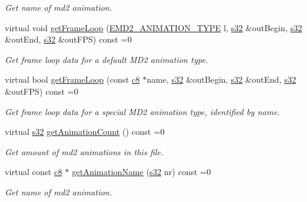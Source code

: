 \begin{DoxyCompactItemize}
\begin{DoxyCompactList}\small\item\em Get name of md2 animation. \end{DoxyCompactList}\item 
virtual void \hyperlink{classirr_1_1scene_1_1IAnimatedMeshMD2_a0bab7f9b11fd11f1fa8f2cd6e085b596}{get\+Frame\+Loop} (\hyperlink{namespaceirr_1_1scene_a08d4a84966e1d2886d0d57e4acbb4f19}{E\+M\+D2\+\_\+\+A\+N\+I\+M\+A\+T\+I\+O\+N\+\_\+\+T\+Y\+PE} l, \hyperlink{namespaceirr_ac66849b7a6ed16e30ebede579f9b47c6}{s32} \&out\+Begin, \hyperlink{namespaceirr_ac66849b7a6ed16e30ebede579f9b47c6}{s32} \&out\+End, \hyperlink{namespaceirr_ac66849b7a6ed16e30ebede579f9b47c6}{s32} \&out\+F\+PS) const =0
\begin{DoxyCompactList}\small\item\em Get frame loop data for a default M\+D2 animation type. \end{DoxyCompactList}\item 
virtual bool \hyperlink{classirr_1_1scene_1_1IAnimatedMeshMD2_a4d52cae663c479d88296561ec961410a}{get\+Frame\+Loop} (const \hyperlink{namespaceirr_a9395eaea339bcb546b319e9c96bf7410}{c8} $\ast$name, \hyperlink{namespaceirr_ac66849b7a6ed16e30ebede579f9b47c6}{s32} \&out\+Begin, \hyperlink{namespaceirr_ac66849b7a6ed16e30ebede579f9b47c6}{s32} \&out\+End, \hyperlink{namespaceirr_ac66849b7a6ed16e30ebede579f9b47c6}{s32} \&out\+F\+PS) const =0
\begin{DoxyCompactList}\small\item\em Get frame loop data for a special M\+D2 animation type, identified by name. \end{DoxyCompactList}\item 
\mbox{\label{classirr_1_1scene_1_1IAnimatedMeshMD2_abb4479ea266ea54230bf21c36319b323}} 
virtual \hyperlink{namespaceirr_ac66849b7a6ed16e30ebede579f9b47c6}{s32} \hyperlink{classirr_1_1scene_1_1IAnimatedMeshMD2_abb4479ea266ea54230bf21c36319b323}{get\+Animation\+Count} () const =0
\begin{DoxyCompactList}\small\item\em Get amount of md2 animations in this file. \end{DoxyCompactList}\item 
virtual const \hyperlink{namespaceirr_a9395eaea339bcb546b319e9c96bf7410}{c8} $\ast$ \hyperlink{classirr_1_1scene_1_1IAnimatedMeshMD2_aa619158d0fc11ea1032d838abf3566ca}{get\+Animation\+Name} (\hyperlink{namespaceirr_ac66849b7a6ed16e30ebede579f9b47c6}{s32} nr) const =0
\begin{DoxyCompactList}\small\item\em Get name of md2 animation. \end{DoxyCompactList}\end{DoxyCompactItemize}
